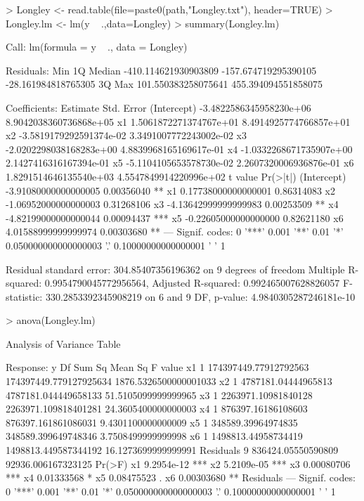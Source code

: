 \documentclass[10pt]{article}
\begin{document}
\begin{Schunk}
\begin{Sinput}
> Longley <- read.table(file=paste0(path,"Longley.txt"), header=TRUE)
> Longley.lm <- lm(y ~ .,data=Longley)
> summary(Longley.lm)
\end{Sinput}
\begin{Soutput}
Call:
lm(formula = y ~ ., data = Longley)

Residuals:
                 Min                   1Q               Median 
-410.114621930903809 -157.674719295390105  -28.161984818765305 
                  3Q                  Max 
 101.550383258075641  455.394094551858075 

Coefficients:
                           Estimate              Std. Error
(Intercept) -3.4822586345958230e+06  8.9042038360736868e+05
x1           1.5061872271374767e+01  8.4914925774766857e+01
x2          -3.5819179292591374e-02  3.3491007772243002e-02
x3          -2.0202298038168283e+00  4.8839968165169617e-01
x4          -1.0332268671735907e+00  2.1427416316167394e-01
x5          -5.1104105653578730e-02  2.2607320006936876e-01
x6           1.8291514646135540e+03  4.5547849914220996e+02
                         t value   Pr(>|t|)    
(Intercept) -3.91080000000000005 0.00356040 ** 
x1           0.17738000000000001 0.86314083    
x2          -1.06952000000000003 0.31268106    
x3          -4.13642999999999983 0.00253509 ** 
x4          -4.82199000000000044 0.00094437 ***
x5          -0.22605000000000000 0.82621180    
x6           4.01588999999999974 0.00303680 ** 
---
Signif. codes:  
0 '***' 0.001 '**' 0.01 '*' 0.050000000000000003 '.' 0.10000000000000001 ' ' 1

Residual standard error: 304.85407356196362 on 9 degrees of freedom
Multiple R-squared:  0.9954790045772956564,	Adjusted R-squared:  0.992465007628826057 
F-statistic: 330.2853392345908219 on 6 and 9 DF,  p-value: 4.9840305287246181e-10
\end{Soutput}
\begin{Sinput}
> anova(Longley.lm)
\end{Sinput}
\begin{Soutput}
Analysis of Variance Table

Response: y
          Df                Sum Sq                Mean Sq               F value
x1         1 174397449.77912792563 174397449.779127925634 1876.5326500000001033
x2         1   4787181.04444965813   4787181.044449658133   51.5105099999999965
x3         1   2263971.10981840128   2263971.109818401281   24.3605400000000003
x4         1    876397.16186108603    876397.161861086031    9.4301100000000009
x5         1    348589.39964974835    348589.399649748346    3.7508499999999998
x6         1   1498813.44958734419   1498813.449587344192   16.1273699999999991
Residuals  9    836424.05550590809     92936.006167323125                      
              Pr(>F)    
x1        9.2954e-12 ***
x2        5.2109e-05 ***
x3        0.00080706 ***
x4        0.01333568 *  
x5        0.08475523 .  
x6        0.00303680 ** 
Residuals               
---
Signif. codes:  
0 '***' 0.001 '**' 0.01 '*' 0.050000000000000003 '.' 0.10000000000000001 ' ' 1
\end{Soutput}
\end{Schunk}
\end{document}
